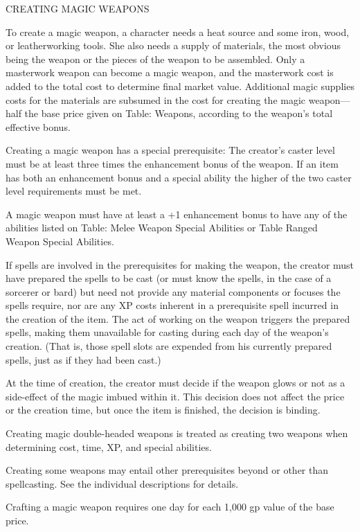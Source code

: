 \vspace{12pt}
{\large CREATING MAGIC WEAPONS}

To create a magic weapon, a character needs a heat source and some iron, wood, 
or leatherworking tools. She also needs a supply of materials, the most obvious 
being the weapon or the pieces of the weapon to be assembled. Only a masterwork 
weapon can become a magic weapon, and the masterwork cost is added to the total 
cost to determine final market value. Additional magic supplies costs for the materials 
are subsumed in the cost for creating the magic weapon---half the base price given 
on Table: Weapons, according to the weapon's total effective bonus.

Creating a magic weapon has a special prerequisite: The creator's caster level 
must be at least three times the enhancement bonus of the weapon. If an item has 
both an enhancement bonus and a special ability the higher of the two caster level 
requirements must be met.

A magic weapon must have at least a +1 enhancement bonus to have any of the abilities 
listed on Table: Melee Weapon Special Abilities or Table Ranged Weapon Special 
Abilities.

If spells are involved in the prerequisites for making the weapon, the creator 
must have prepared the spells to be cast (or must know the spells, in the case 
of a sorcerer or bard) but need not provide any material components or focuses 
the spells require, nor are any XP costs inherent in a prerequisite spell incurred 
in the creation of the item. The act of working on the weapon triggers the prepared 
spells, making them unavailable for casting during each day of the weapon's creation. 
(That is, those spell slots are expended from his currently prepared spells, just 
as if they had been cast.)

At the time of creation, the creator must decide if the weapon glows or not as 
a side-effect of the magic imbued within it. This decision does not affect the 
price or the creation time, but once the item is finished, the decision is binding.

Creating magic double-headed weapons is treated as creating two weapons when determining 
cost, time, XP, and special abilities.

Creating some weapons may entail other prerequisites beyond or other than spellcasting. 
See the individual descriptions for details.

Crafting a magic weapon requires one day for each 1,000 gp value of the base price.

